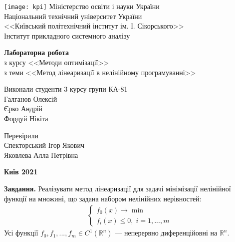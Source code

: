 \documentclass{extreport}
\begin{document}
\begin{titlepage}
    \thispagestyle{empty}
    \begin{center}
        \texttt{[image: kpi]}
        Міністерство освіти і науки України\\
        Національний технічний університет України\\
        <<Київський політехнічний інститут ім. І. Сікорського>>\\
        Інститут прикладного системного аналізу
    \end{center}
    \vspace{40mm}
    \begin{center}
        \textbf{Лабораторна робота} \\
        з курсу <<Методи оптимізації>> \\
        з теми <<Метод лінеаризації в нелінійному програмуванні>>
    \end{center}
    \vspace{20mm}
    \begin{flushleft}
        Виконали студенти 3 курсу групи КА-81 \\
        Галганов Олексій \\
        Єрко Андрій \\
        Фордуй Нікіта
    \end{flushleft}
    \begin{flushright}
        Перевірили \\
        Спекторський Ігор Якович \\
        Яковлева Алла Петрівна
    \end{flushright}
    \vspace{30mm}
    \begin{center}
        \textbf{Київ 2021}
    \end{center}
\end{titlepage}


\noindent\textbf{Завдання.} Реалізувати метод лінеаризації для задачі мінімізації нелінійної функції на множині, що задана набором нелінійних нерівностей:
\begin{gather}
    \begin{cases}
        f_0(x) \to \min \\
        f_i(x) \leq 0, \; i = 1,...,m
    \end{cases}
\end{gather}
Усі функції $f_0, f_1, ..., f_m \in C^1 (\mathbb{R}^n)$ --- неперервно диференційовні на $\mathbb{R}^n$.
\end{document}
